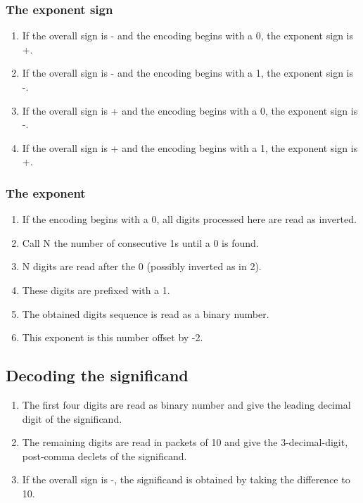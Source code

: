 \documentclass{acm_proc_article-sp}
\begin{document}
\subsubsection{The exponent sign}

\begin{enumerate}
\item If the overall sign is - and the encoding begins with a 0, the exponent sign is +.
\item If the overall sign is - and the encoding begins with a 1, the exponent sign is -.
\item If the overall sign is + and the encoding begins with a 0, the exponent sign is -.
\item If the overall sign is + and the encoding begins with a 1, the exponent sign is +.
\end{enumerate}

\subsubsection{The exponent}

\begin{enumerate}
\item If the encoding begins with a 0, all digits processed here are read as inverted.
\item  Call N the number of consecutive 1s until a 0 is found.
\item  N digits are read after the 0 (possibly inverted as in 2).
\item  These digits are prefixed with a 1.
\item  The obtained digits sequence is read as a binary number.
\item  This exponent is this number offset by -2.
\end{enumerate}

\subsection{Decoding the significand}
\begin{enumerate}
\item The first four digits are read as binary number and give the leading decimal digit of the significand.
\item The remaining digits are read in packets of 10 and give the 3-decimal-digit, post-comma declets of the significand.
\item If the overall sign is -, the significand is obtained by taking the difference to 10.
\end{enumerate}
\end{document}
